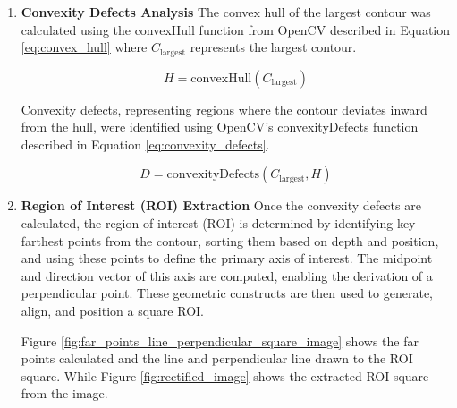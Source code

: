\begin{enumerate}
    \item \textbf{Convexity Defects Analysis}
    The convex hull of the largest contour was calculated using the convexHull function from OpenCV described in Equation \ref{eq:convex_hull} where \( C_{\text{largest}} \) represents the largest contour.
    
    \begin{equation}
        H = \text{convexHull}(C_{\text{largest}})
        \label{eq:convex_hull}
    \end{equation}

    Convexity defects, representing regions where the contour deviates inward from the hull, were identified using OpenCV's convexityDefects function described in Equation \ref{eq:convexity_defects}.

    \begin{equation}
        D = \text{convexityDefects}(C_{\text{largest}}, H)
        \label{eq:convexity_defects}
    \end{equation}

    \item \textbf{Region of Interest (ROI) Extraction} 
    Once the convexity defects are calculated, the region of interest (ROI) is determined by identifying key farthest points from the contour, sorting them based on depth and position, and using these points to define the primary axis of interest. The midpoint and direction vector of this axis are computed, enabling the derivation of a perpendicular point. These geometric constructs are then used to generate, align, and position a square ROI.

    Figure \ref{fig:far_points_line_perpendicular_square_image} shows the far points calculated and the line and perpendicular line drawn to the ROI square. While Figure \ref{fig:rectified_image} shows the extracted ROI square from the image.


\end{enumerate}
